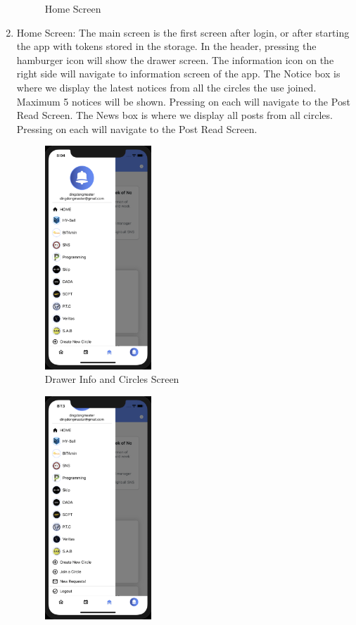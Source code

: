 \documentclass[conference]{IEEEtran}
\begin{document}
\begin{enumerate}
\begin{figure}[h]
        \caption{Home Screen}
        \label{fig:my_label}
    \end{figure}
    \item Home Screen: The main screen is the first screen after login, or after starting the app with tokens stored in the storage. In the header, pressing the hamburger icon will show the drawer screen. The information icon on the right side will navigate to information screen of the app.
    The Notice box is where we display the latest notices from all the circles the use joined. Maximum 5 notices will be shown. Pressing on each will navigate to the Post Read Screen. The News box is where we display all posts from all circles. Pressing on each will navigate to the Post Read Screen.
    \begin{figure}[h]
        \centering
        \includegraphics[width=4cm]{images/drawer1.png}
        \caption{Drawer Info and Circles Screen}
        \label{fig:my_label}
    \end{figure}
    \begin{figure}[h]
        \centering
        \includegraphics[width=4cm]{images/drawer2.png}

\end{figure}
\end{enumerate}
\end{document}
